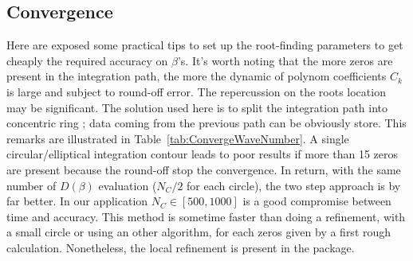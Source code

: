 \documentclass[a4paper,10pt]{article}
\begin{document}
\subsection{Convergence} \label{sec:Conv}

Here are exposed some practical tips to set up the root-finding parameters to get cheaply the required accuracy on $\beta$'s.
It's worth noting that the more zeros are present in the integration path, the more the dynamic of polynom coefficients $C_k$ is large and subject to round-off error. The repercussion on the roots location may be significant. 
The solution used here is to split the integration path into concentric ring ; data coming from the previous path can be obviously store. 
This remarks are illustrated in Table~\ref{tab:ConvergeWaveNumber}. A single circular/elliptical integration contour leads to poor results if more than 15 zeros are present because the round-off stop the convergence. In return, with the same number of $D(\beta)$ evaluation ($N_C/2$ for each circle), the two step approach is by far better. In our application $N_C \in [ 500,1000]$ is a good compromise between time and accuracy.
This method is sometime faster than doing a refinement, with a small circle or using an other algorithm, for each zeros
given by a first rough calculation. Nonetheless, the local refinement is present in the package.
%
\end{document}

